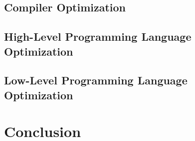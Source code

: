 \documentclass[sigconf, review=false]{acmart}
\begin{document}
\subsection{Compiler Optimization}

\subsection{High-Level Programming Language Optimization}

\subsection{Low-Level Programming Language Optimization}



\section{Conclusion}





\end{document}
